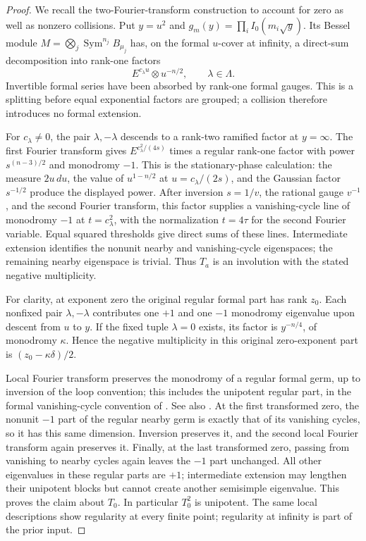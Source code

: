 \documentclass[11pt,a4paper]{article}
\theoremstyle{definition}
\theoremstyle{remark}
\numberwithin{equation}{section}
\begin{document}
\begin{proof}
We recall the two-Fourier-transform construction to account for
zero as well as nonzero collisions.  Put $y=u^2$ and
$g_m(y)=\prod_i I_0(m_i\sqrt y)$.  Its Bessel module
$M=\bigotimes_j\operatorname{Sym}^{n_j}B_{\mu_j}$ has, on the
formal $u$-cover at infinity, a direct-sum decomposition into
rank-one factors
\[
             E^{c_\lambda u}\otimes u^{-n/2},
                         \qquad \lambda\in\Lambda.
\]
Invertible formal series have been absorbed by rank-one formal
gauges.  This is a splitting before equal exponential factors
are grouped; a collision therefore introduces no formal extension.

For $c_\lambda\ne0$, the pair $\lambda,-\lambda$ descends to
a rank-two ramified factor at $y=\infty$.  The first Fourier
transform gives
$E^{c_\lambda^2/(4s)}$ times a regular rank-one factor with power
$s^{(n-3)/2}$ and monodromy $-1$.
This is the stationary-phase calculation: the measure $2u\,du$,
the value of $u^{1-n/2}$ at $u=c_\lambda/(2s)$, and the Gaussian
factor $s^{-1/2}$ produce the displayed power.
After inversion $s=1/v$, the rational gauge $v^{-1}$, and the
second Fourier transform, this
factor supplies a vanishing-cycle line of monodromy $-1$ at
$t=c_\lambda^2$, with the normalization $t=4\tau$ for the
second Fourier variable.  Equal squared thresholds give direct
sums of these lines.  Intermediate extension identifies the
nonunit nearby and vanishing-cycle eigenspaces; the remaining
nearby eigenspace is trivial.  Thus $T_a$ is an involution with
the stated negative multiplicity.

For clarity, at exponent zero the original regular formal part
has rank $z_0$.  Each nonfixed pair $\lambda,-\lambda$ contributes
one $+1$ and one $-1$ monodromy eigenvalue upon descent from
$u$ to $y$.  If the fixed tuple $\lambda=0$ exists, its factor
is $y^{-n/4}$, of monodromy $\kappa$.
Hence the negative multiplicity in this original zero-exponent
part is $(z_0-\kappa\delta)/2$.

Local Fourier transform preserves the monodromy of a regular
formal germ, up to inversion of the loop convention; this
includes the unipotent regular part, in the formal vanishing-cycle
convention of \cite[Corollary 2.3 and \S3.3]{p8:LJR_Arinkin}.
See also \cite{p5:BG_Sabbah2008,p5:BG_GarciaLopez2004}.
At the first transformed zero, the nonunit $-1$ part of the
regular nearby germ is exactly that of its vanishing cycles,
so it has this same dimension.  Inversion preserves it, and
the second local Fourier transform again preserves it.
Finally, at the last transformed zero, passing from vanishing
to nearby cycles again leaves the $-1$ part unchanged.
All other eigenvalues in these regular parts are $+1$;
intermediate extension may lengthen their unipotent blocks but
cannot create another semisimple eigenvalue.  This proves the
claim about $T_0$.  In particular $T_0^2$ is unipotent.
The same local descriptions show regularity at every finite
point; regularity at infinity is part of the prior input.


\end{proof}
\end{document}

